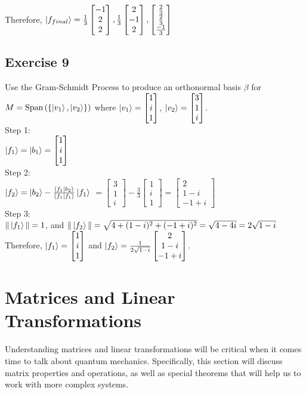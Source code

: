\documentclass[12pt]{article}
\theoremstyle{plain}
\theoremstyle{nonumberplain}
\theoremstyle{plain}
\theoremstyle{nonumberplain}
\newcommand\1{{\bf 1}}
\newcommand{\bmat}[1]{\begin{bmatrix*} #1 \end{bmatrix*}} %
\newcommand{\<}{\left\langle}
\renewcommand{\>}{\right\rangle}
\newcommand{\inp}[2]{\left\langle#1\mid #2\right\rangle} %
\begin{document}
Therefore, $\ket{f_{final}}=\frac{1}{3}\bmat{-1 \\ 2 \\ 2}, \frac{1}{3}\bmat{2 \\ -1 \\ 2}, \bmat{\frac{2}{3} \\ \frac{2}{3} \\ \frac{-1}{3}}$


\subsection{Exercise 9}
Use the Gram-Schmidt Process to produce an orthonormal basis $\beta$ for $M=\text{Span}\left( \left\lbrace \ket{v_1},\ket{v_2} \right\rbrace \right) $ where $\ket{v_1}=\bmat{1 \\ i \\ 1}$, $\ket{v_2}=\bmat{3 \\ 1 \\ i}$. \\
Step 1: \\
$\ket{f_1}=\ket{b_1}=\bmat{1 \\ i \\ 1}$ \\
Step 2: \\
$\ket{f_2}=\ket{b_2}-\frac{\inp{f_1}{b_2}}{\inp{f_1}{f_1}}\ket{f_1}$
$=\bmat{3 \\ 1 \\ i}-\frac{3}{3}\bmat{1 \\ i \\ 1}=\bmat{2 \\ 1-i \\ -1+i}$ \\
Step 3: \\
$\Vert\ket{f_1}\Vert=1$, and $\Vert\ket{f_2}\Vert=\sqrt{4+(1-i)^2+(-1+i)^2}=\sqrt{4-4i}=2\sqrt{1-i}$ \\
Therefore, $\ket{f_1}=\bmat{1 \\ i \\ 1}$ and $\ket{f_2}=\frac{1}{2\sqrt{1-i}}\bmat{2 \\ 1-i \\ -1+i}$.


\section{Matrices and Linear Transformations}
Understanding matrices and linear transformations will be critical when it comes time to talk about quantum mechanics. Specifically, this section will discuss matrix properties and operations, as well as special theorems that will help us to work with more complex systems.
\end{document}
